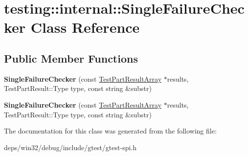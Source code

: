 \hypertarget{classtesting_1_1internal_1_1_single_failure_checker}{}\section{testing\+:\+:internal\+:\+:Single\+Failure\+Checker Class Reference}
\label{classtesting_1_1internal_1_1_single_failure_checker}
\subsection*{Public Member Functions}
\begin{DoxyCompactItemize}
\item 
\hypertarget{classtesting_1_1internal_1_1_single_failure_checker_a6d350d385526c97c9982e928f5f8fb56}{}{\bfseries Single\+Failure\+Checker} (const \hyperlink{classtesting_1_1_test_part_result_array}{Test\+Part\+Result\+Array} $\ast$results, Test\+Part\+Result\+::\+Type type, const string \&substr)\label{classtesting_1_1internal_1_1_single_failure_checker_a6d350d385526c97c9982e928f5f8fb56}

\item 
\hypertarget{classtesting_1_1internal_1_1_single_failure_checker_a6d350d385526c97c9982e928f5f8fb56}{}{\bfseries Single\+Failure\+Checker} (const \hyperlink{classtesting_1_1_test_part_result_array}{Test\+Part\+Result\+Array} $\ast$results, Test\+Part\+Result\+::\+Type type, const string \&substr)\label{classtesting_1_1internal_1_1_single_failure_checker_a6d350d385526c97c9982e928f5f8fb56}

\end{DoxyCompactItemize}


The documentation for this class was generated from the following file\+:\begin{DoxyCompactItemize}
\item 
deps/win32/debug/include/gtest/gtest-\/spi.\+h\end{DoxyCompactItemize}
